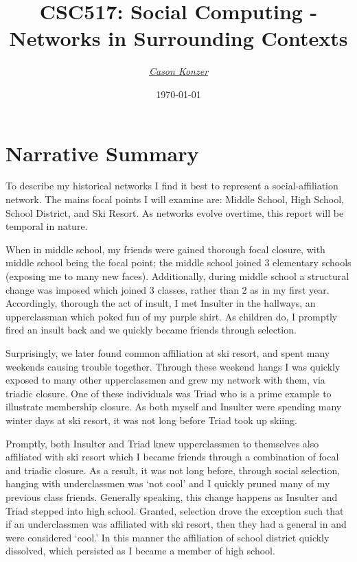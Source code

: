 \documentclass[12pt]{article}
\newcommand{\XB}{\color{black}}
\newcommand{\XV}{\color{violet}}
\begin{document}
\title{\textbf{CSC517}: Social Computing - \\ Networks in Surrounding Contexts}
\date{\today}
\author{\XV\textit{\large{\href{https://github.com/casonk}{Cason Konzer}}}\XB}

\maketitle
\hrulefill
\vfill 

\pagebreak

\tableofcontents

\newpage

\section{Narrative Summary}
To describe my historical networks I find it best to represent a social-affiliation network. 
The mains focal points I will examine are: Middle School, High School, School District, and Ski Resort. 
As networks evolve overtime, this report will be temporal in nature. 

When in middle school, my friends were gained thorough focal closure, with middle school being the focal point; the middle school joined 3 elementary schools (exposing me to many new faces). 
Additionally, during middle school a structural change was imposed which joined 3 classes, rather than 2 as in my first year. 
Accordingly, thorough the act of insult, I met Insulter in the hallways, an upperclassman which poked fun of my purple shirt. 
As children do, I promptly fired an insult back and we quickly became friends through selection. 

Surprisingly, we later found common affiliation at ski resort, and spent many weekends causing trouble together. 
Through these weekend hangs I was quickly exposed to many other upperclassmen and grew my network with them, via triadic closure. 
One of these individuals was Triad who is a prime example to illustrate membership closure. 
As both myself and Insulter were spending many winter days at ski resort, it was not long before Triad took up skiing.

Promptly, both Insulter and Triad knew upperclassmen to themselves also affiliated with ski resort which I became friends through a combination of focal and triadic closure. 
As a result, it was not long before, through social selection, hanging with underclassmen was `not cool' and I quickly pruned many of my previous class friends. 
Generally speaking, this change happens as Insulter and Triad stepped into high school. 
Granted, selection drove the exception such that if an underclassmen was affiliated with ski resort, then they had a general in and were considered `cool.'
In this manner the affiliation of school district quickly dissolved, which persisted as I became a member of high school. 
\end{document}

